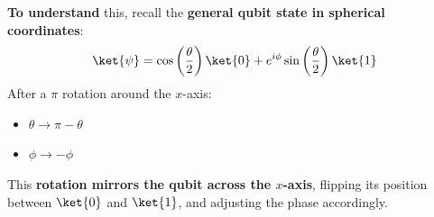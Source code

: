 \highspace
\textbf{To understand} this, recall the \textbf{general qubit state in spherical coordinates}:
\begin{equation*}
   \ket{\psi} = \cos\left(\dfrac{\theta}{2}\right) \ket{0} + e^{i \phi} \sin\left(\dfrac{\theta}{2}\right) \ket{1}
\end{equation*}
After a $\pi$ rotation around the $x$-axis:
\begin{itemize}
   \item $\theta \rightarrow \pi - \theta$
   \item $\phi \rightarrow -\phi$ 
\end{itemize}
This \textbf{rotation mirrors the qubit across the $x$-axis}, flipping its position between $\ket{0}$ and $\ket{1}$, and adjusting the phase accordingly.

\newpage

